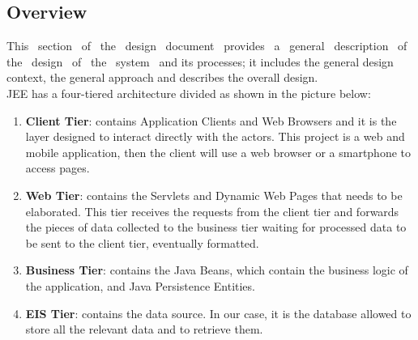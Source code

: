 \documentclass[a4paper,11pt]{report} %
\begin{document}
	\subsection{Overview} This  section  of  the  design  document  provides  a  general  description  of  the  design  of  the  system  and  its  processes;  it includes  the  general  design  context,  the  general  approach  and  describes  the overall design.\\JEE has a four-tiered architecture divided as shown in the picture below:\\
		\begin{minipage}{\linewidth}
		\end{minipage}	
		\begin{enumerate}
			\item \textbf{Client Tier}: contains Application Clients and Web Browsers and it is the layer designed to interact directly with the actors. This project is a web and mobile application, then the client will use a web browser or a smartphone to access pages.
			\item \textbf{Web Tier}: contains the Servlets and Dynamic Web Pages that needs to be elaborated. This tier receives the requests from the client tier and forwards the pieces of data collected to the business tier waiting for processed data to be sent to the client tier, eventually formatted.
			\item \textbf{Business Tier}: contains the Java Beans, which contain the business logic of the application, and Java Persistence Entities.
			\item \textbf{EIS Tier}: contains the data source. In our case, it is the database allowed to store all the relevant data and to retrieve them.									
		\end{enumerate}
\end{document}
